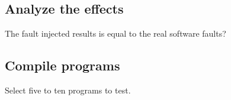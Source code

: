 \subsection{Analyze the effects}

The fault injected results is equal to the real software faults?

\subsection{Compile programs}

Select five to ten programs to test.

